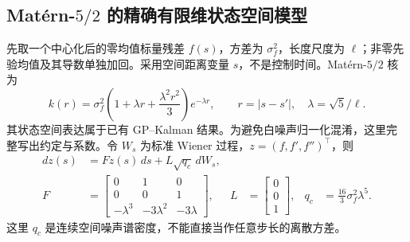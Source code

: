 \documentclass[11pt,a4paper]{article}
\numberwithin{equation}{section}
\theoremstyle{definition}
\newcommand{\abs}[1]{\left\lvert#1\right\rvert}
\begin{document}
\subsection{Mat\'ern-$5/2$ 的精确有限维状态空间模型}
\label{bel:matern}

先取一个中心化后的零均值标量残差 $f(s)$，方差为 $\sigma_f^2$，长度尺度为 $\ell$；非零先验均值及其导数单独加回。采用空间距离变量 $s$，不是控制时间。Mat\'ern-$5/2$ 核为
\begin{equation}
 k(r)=\sigma_f^2\left(1+\lambda r+\frac{\lambda^2r^2}{3}\right)e^{-\lambda r},
 \qquad r=\abs{s-s'},\quad \lambda=\sqrt5/\ell.
 \label{bel:matern-kernel}
\end{equation}
其状态空间表达属于已有 GP--Kalman 结果\cite{bel_hartikainen2010}。为避免白噪声归一化混淆，这里完整写出约定与系数。令 $W_s$ 为标准 Wiener 过程，$z=(f,f',f'')^\top$，则
\begin{align}
 dz(s)&=Fz(s)\,ds+L\sqrt{q_c}\,dW_s,\\
 F&=\begin{bmatrix}0&1&0\\0&0&1\\-\lambda^3&-3\lambda^2&-3\lambda\end{bmatrix},
 &L&=\begin{bmatrix}0\\0\\1\end{bmatrix},
 &q_c&=\frac{16}{3}\sigma_f^2\lambda^5.
 \label{bel:matern-sde}
\end{align}
这里 $q_c$ 是连续空间噪声谱密度，不能直接当作任意步长的离散方差。
\end{document}
